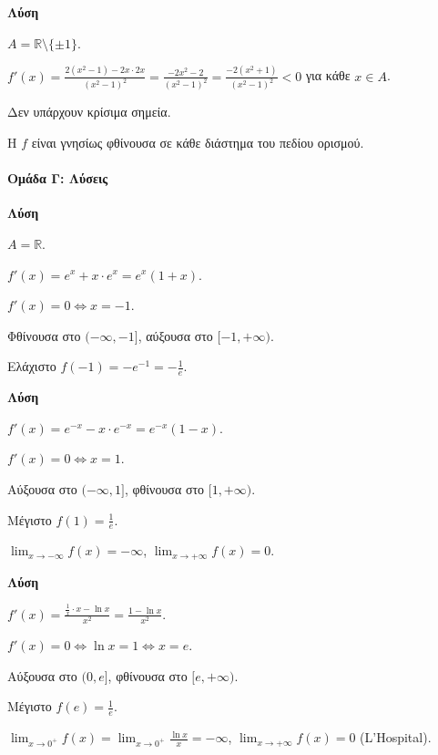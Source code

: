 \documentclass[11pt,a4paper,modern]{FFExercises}
\begin{document}
\askhsh %
\textbf{Λύση}
\begin{alist}
    \item $A = \mathbb{R} \setminus \{\pm 1\}$.
    \item $f'(x) = \frac{2(x^2-1) - 2x \cdot 2x}{(x^2-1)^2} = \frac{-2x^2 - 2}{(x^2-1)^2} = \frac{-2(x^2+1)}{(x^2-1)^2} < 0$ για κάθε $x \in A$.
    \item Δεν υπάρχουν κρίσιμα σημεία.
    \item Η $f$ είναι γνησίως φθίνουσα σε κάθε διάστημα του πεδίου ορισμού.
\end{alist}

\paragraph{Ομάδα Γ: Λύσεις}

\askhsh %
\textbf{Λύση}
\begin{alist}
    \item $A = \mathbb{R}$.
    \item $f'(x) = e^x + x \cdot e^x = e^x(1 + x)$.
    \item $f'(x) = 0 \Leftrightarrow x = -1$.
    \item Φθίνουσα στο $(-\infty, -1]$, αύξουσα στο $[-1, +\infty)$.
    \item Ελάχιστο $f(-1) = -e^{-1} = -\frac{1}{e}$.
\end{alist}

\askhsh %
\textbf{Λύση}
\begin{alist}
    \item $f'(x) = e^{-x} - x \cdot e^{-x} = e^{-x}(1 - x)$.
    \item $f'(x) = 0 \Leftrightarrow x = 1$.
    \item Αύξουσα στο $(-\infty, 1]$, φθίνουσα στο $[1, +\infty)$.
    \item Μέγιστο $f(1) = \frac{1}{e}$.
    \item $\lim_{x \to -\infty} f(x) = -\infty$, $\lim_{x \to +\infty} f(x) = 0$.
\end{alist}

\askhsh %
\textbf{Λύση}
\begin{alist}
    \item $f'(x) = \frac{\frac{1}{x} \cdot x - \ln x}{x^2} = \frac{1 - \ln x}{x^2}$.
    \item $f'(x) = 0 \Leftrightarrow \ln x = 1 \Leftrightarrow x = e$.
    \item Αύξουσα στο $(0, e]$, φθίνουσα στο $[e, +\infty)$.
    \item Μέγιστο $f(e) = \frac{1}{e}$.
    \item $\lim_{x \to 0^+} f(x) = \lim_{x \to 0^+} \frac{\ln x}{x} = -\infty$, $\lim_{x \to +\infty} f(x) = 0$ (L'Hospital).
\end{alist}
\end{document}
